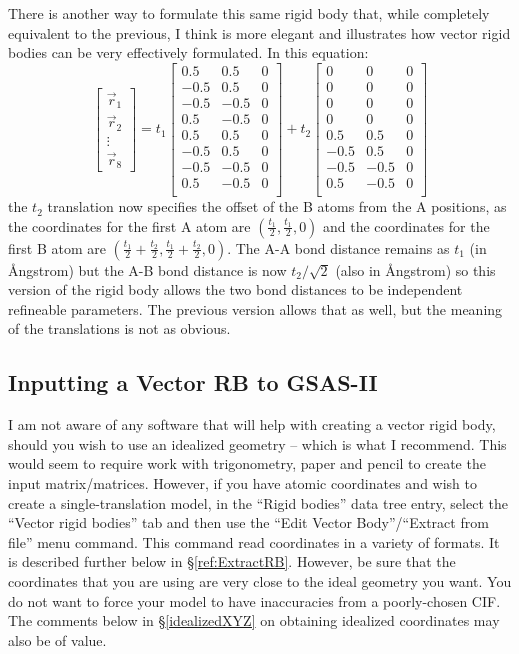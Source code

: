 There is another way to formulate this same rigid body that, while completely equivalent to the previous, I think is more elegant and illustrates how vector rigid bodies can be very effectively formulated. In this equation: 
$$
\begin{bmatrix}
\vec{r}_1 \\
\vec{r}_2 \\
\vdots \\
\vec{r}_8
\end{bmatrix}
= 
t_1
\begin{bmatrix}
0.5&0.5&0 \\
-0.5&0.5&0 \\
-0.5&-0.5&0 \\
0.5&-0.5&0 \\
0.5&0.5&0 \\
-0.5&0.5&0 \\
-0.5&-0.5&0 \\
0.5&-0.5&0 \\
\end{bmatrix}
+
t_2
\begin{bmatrix}
0&0&0 \\
0&0&0 \\
0&0&0 \\
0&0&0 \\
0.5&0.5&0 \\
-0.5&0.5&0 \\
-0.5&-0.5&0 \\
0.5&-0.5&0 \\
\end{bmatrix}
$$
the $t_2$ translation now specifies the offset of the B atoms from the A positions, as the coordinates for the first A atom are $(\frac{t_1}{2}, \frac{t_1}{2},0)$ and the  coordinates for the first B atom are $(\frac{t_1}{2}+\frac{t_2}{2}, \frac{t_1}{2}+\frac{t_2}{2},0)$. The A-A bond distance remains as $t_1$ (in Ångstrom) but the A-B bond distance is now $t_2/\sqrt2$ (also in Ångstrom) so this version of the rigid body allows the two bond distances to be independent refineable parameters. The previous version allows that as well, but the meaning of the translations is not as obvious. 

\subsection{Inputting a Vector RB to GSAS-II}
I am not aware of any software that will help with creating a vector rigid body, should you wish to use an idealized geometry -- which is what I recommend. This would seem to require work with trigonometry, paper and pencil to create the input matrix/matrices. However, if you have atomic coordinates and wish to create a single-translation model, in the ``Rigid bodies'' data tree entry, select the ``Vector rigid bodies'' tab and then use the ``Edit Vector Body''/``Extract from file'' menu command. This command read coordinates in a variety of formats. It is described further below in \S\ref{ref:ExtractRB}. However, be sure that the coordinates that you are using are very close to the ideal geometry you want. You do not want to force your model to have inaccuracies from a poorly-chosen CIF. The comments below in \S\ref{idealizedXYZ} on obtaining idealized coordinates may also be of value. 


